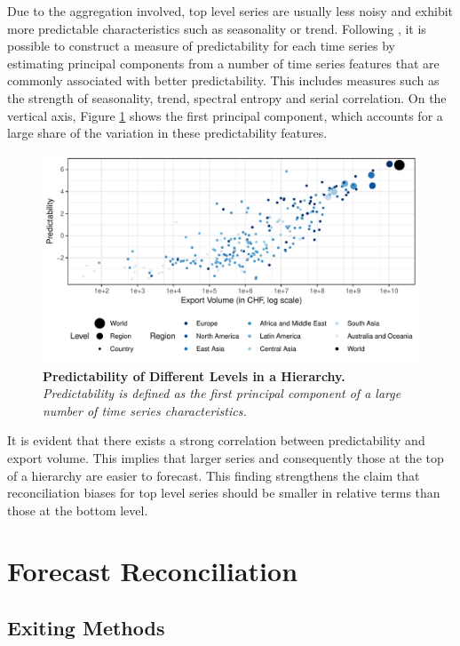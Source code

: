 \documentclass[a4paper,fleqn,11pt]{article}
\begin{document}
Due to the aggregation involved, top level series are usually less noisy and exhibit more predictable characteristics such as seasonality or trend. Following \cite{Kang2017}, it is possible to construct a measure of predictability for each time series by estimating principal components from a number of time series features that are commonly associated with better predictability. This includes measures such as the strength of seasonality, trend, spectral entropy and serial correlation.  On the vertical axis, Figure \ref{fig:feature} shows the first principal component, which accounts for a large share of the variation in these predictability features.
\begin{figure}[H]
	\includegraphics[width=\textwidth]{fig/fig_confetti}
	\caption[Predictability of Different Levels in a Hierarchy]{\textbf{Predictability of Different Levels in a Hierarchy.}\textit{ Predictability is defined as the first principal component of a large number of time series characteristics.}} \label{fig:feature}
\end{figure}
It is evident that there exists a strong correlation between predictability and export volume. This implies that larger series and consequently those at the top of a hierarchy are easier to forecast. This finding strengthens the claim that reconciliation biases for top level series should be smaller in relative terms than those at the bottom level.\\

\section{Forecast Reconciliation}
\label{sec:methods}

\subsection{Exiting Methods}
	
\end{document}
